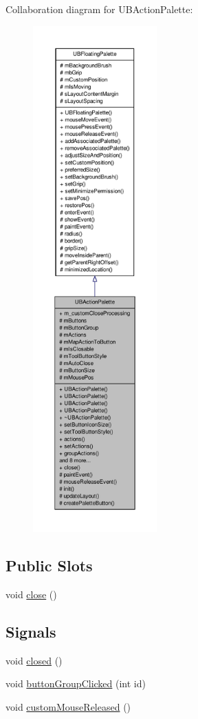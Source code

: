 Collaboration diagram for U\-B\-Action\-Palette\-:
\nopagebreak
\begin{figure}[H]
\begin{center}
\leavevmode
\includegraphics[height=550pt]{d9/d10/class_u_b_action_palette__coll__graph}
\end{center}
\end{figure}
\subsection*{Public Slots}
\begin{DoxyCompactItemize}
\item 
void \hyperlink{class_u_b_action_palette_a23c62043071f0e7691a0dbdfcc20a2dd}{close} ()
\end{DoxyCompactItemize}
\subsection*{Signals}
\begin{DoxyCompactItemize}
\item 
void \hyperlink{class_u_b_action_palette_aa1e453b054ded51a722466d5dbfb7d39}{closed} ()
\item 
void \hyperlink{class_u_b_action_palette_ada3077d2b24368051f6d63f704bdddde}{button\-Group\-Clicked} (int id)
\item 
void \hyperlink{class_u_b_action_palette_a9e42a864ce70634a073043b87efcd47e}{custom\-Mouse\-Released} ()
\end{DoxyCompactItemize}
